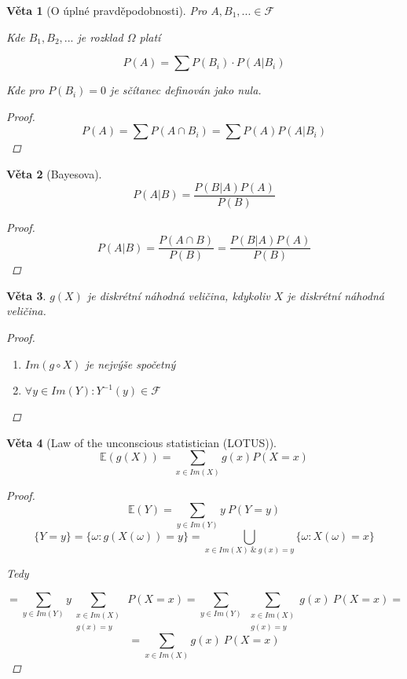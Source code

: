 \documentclass[10pt,a4paper]{article}
\theoremstyle{plain}
\newtheorem{veta}{Věta}
\theoremstyle{definition}
\begin{document}
\begin{veta}[O úplné pravděpodobnosti]
Pro $A, B_1, ... \in \mathcal{F}$

Kde $B_1, B_2, ...$ je rozklad $\Omega$ platí

\[ P(A) = \sum P(B_i) \cdot P(A|B_i)\] 

Kde pro $P(B_i) = 0$ je sčítanec definován jako nula.

\begin{proof}
\[ P(A) = \sum P(A \cap B_i) = \sum P(A)P(A|B_i) \]
\end{proof}
\end{veta}


\begin{veta}[Bayesova]
\[ P(A|B) = \frac{P(B|A) P(A)}{P(B)}\]
\begin{proof}
\[ P(A|B)  = \frac{P(A \cap B)}{P(B)} = \frac{P(B|A) P(A)}{P(B)} \]
\end{proof}
\end{veta}


\begin{veta}
$g(X)$ je diskrétní náhodná veličina, kdykoliv $X$ je diskrétní náhodná veličina.
\begin{proof}
\begin{enumerate}
\item $Im(g \circ X)$ je nejvýše spočetný
\item $\forall y \in Im(Y): Y^{-1}(y) \in \mathcal{F}$
\end{enumerate}
\end{proof}
\end{veta}


\begin{veta}[Law of the unconscious statistician (LOTUS)]
\[ \mathbb{E}(g(X)) = \sum_{x \in Im(X)} g(x) P(X = x)\]
\begin{proof}

\[ \mathbb{E}(Y) 
= \sum_{y \in Im(Y)} y \  P(Y = y) \]\[ 
\{ Y = y \} = \{ \omega: g(X(\omega)) = y \} = \bigcup_{x \in Im(X) \ \&\ g(x) = y} \{ \omega: X(\omega) = x \} \]

Tedy 

\[ = \sum_{y \in Im(Y)} y \sum_{\begin{matrix}x \in Im(X) \\ g(x) = y \end{matrix}}\ P(X=x) = \sum_{y \in Im(Y)}\ \sum_{\begin{matrix}x \in Im(X) \\ g(x) = y \end{matrix}} g(x)\ P(X=x) =  \]\[
=  \sum_{x \in Im(X)} g(x)\ P(X=x) \]
\end{proof}
\end{veta}
\end{document}
